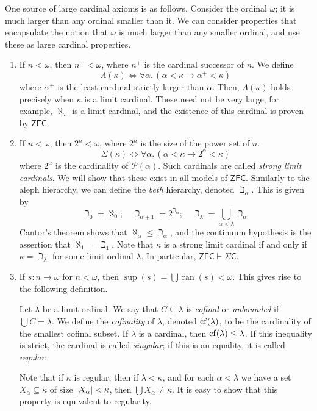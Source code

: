 One source of large cardinal axioms is as follows.
Consider the ordinal \( \omega \); it is much larger than any ordinal smaller than it.
We can consider properties that encapsulate the notion that \( \omega \) is much larger than any smaller ordinal, and use these as large cardinal properties.

\begin{enumerate}
    \item If \( n < \omega \), then \( n^+ < \omega \), where \( n^+ \) is the cardinal successor of \( n \).
    We define
    \[ \Lambda(\kappa) \iff \forall \alpha.\, (\alpha < \kappa \to \alpha^+ < \kappa) \]
    where \( \alpha^+ \) is the least cardinal strictly larger than \( \alpha \).
    Then, \( \Lambda(\kappa) \) holds precisely when \( \kappa \) is a limit cardinal.
    These need not be very large, for example, \( \aleph_\omega \) is a limit cardinal, and the existence of this cardinal is proven by \( \mathsf{ZFC} \).
    \item If \( n < \omega \), then \( 2^n < \omega \), where \( 2^n \) is the size of the power set of \( n \).
    \[ \Sigma(\kappa) \iff \forall \alpha.\, (\alpha < \kappa \to 2^\alpha < \kappa) \]
    where \( 2^\alpha \) is the cardinality of \( \mathcal P(\alpha) \).
    Such cardinals are called \emph{strong limit cardinals}.
    We will show that these exist in all models of \( \mathsf{ZFC} \).
    Similarly to the aleph hierarchy, we can define the \emph{beth} hierarchy, denoted \( \beth_\alpha \).
    This is given by
    \[ \beth_0 = \aleph_0;\quad \beth_{\alpha + 1} = 2^{\beth_\alpha};\quad \beth_{\lambda} = \bigcup_{\alpha < \lambda} \beth_\alpha \]
    Cantor's theorem shows that \( \aleph_\alpha \leq \beth_\alpha \), and the continuum hypothesis is the assertion that \( \aleph_1 = \beth_1 \).
    Note that \( \kappa \) is a strong limit cardinal if and only if \( \kappa = \beth_\lambda \) for some limit ordinal \( \lambda \).
    In particular, \( \mathsf{ZFC} \vdash \Sigma \mathsf{C} \).
    \item If \( s : n \to \omega \) for \( n < \omega \), then \( \sup(s) = \bigcup \operatorname{ran}(s) < \omega \).
    This gives rise to the following definition.
    \begin{definition}
        Let \( \lambda \) be a limit ordinal.
        We say that \( C \subseteq \lambda \) is \emph{cofinal} or \emph{unbounded} if \( \bigcup C = \lambda \).
        We define the \emph{cofinality} of \( \lambda \), denoted \( \operatorname{cf}(\lambda) \), to be the cardinality of the smallest cofinal subset.
        If \( \lambda \) is a cardinal, then \( \operatorname{cf}(\lambda) \leq \lambda \).
        If this inequality is strict, the cardinal is called \emph{singular}; if this is an equality, it is called \emph{regular}.
    \end{definition}
    Note that if \( \kappa \) is regular, then if \( \lambda < \kappa \), and for each \( \alpha < \lambda \) we have a set \( X_\alpha \subseteq \kappa \) of size \( \abs{X_\alpha} < \kappa \), then \( \bigcup X_\alpha \neq \kappa \).
    It is easy to show that this property is equivalent to regularity.


\end{enumerate}
